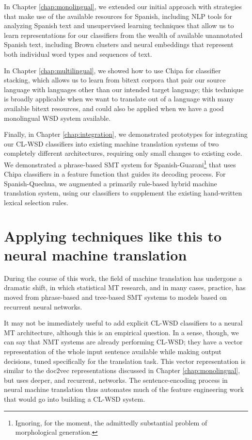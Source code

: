 In Chapter \ref{chap:monolingual}, we extended our initial approach with
strategies that make use of the available resources for Spanish, including NLP
tools for analyzing Spanish text and unsupervised learning techniques that
allow us to learn representations for our classifiers from the wealth of
available unannotated Spanish text, including Brown clusters and neural
embeddings that represent both individual word types and sequences of text.

In Chapter \ref{chap:multilingual}, we showed how to use Chipa for classifier
stacking, which allows us to learn from bitext corpora that pair our source
language with languages other than our intended target language; this technique
is broadly applicable when we want to translate out of a language with many
available bitext resources, and could also be applied when we have a good
monolingual WSD system available.

Finally, in Chapter \ref{chap:integration}, we demonstrated prototypes for
integrating our CL-WSD classifiers into existing machine translation systems of
two completely different architectures, requiring only small changes to
existing code.  We demonstrated a phrase-based SMT system for
Spanish-Guarani\footnote{Ignoring, for the moment, the admittedly substantial
problem of morphological generation.} that uses Chipa classifiers in a feature
function that guides its decoding process. For Spanish-Quechua, we augmented a
primarily rule-based hybrid machine translation system, using our classifiers
to supplement the existing hand-written lexical selection rules.

\section{Applying techniques like this to neural machine translation}
During the course of this work, the field of machine translation has undergone
a dramatic shift, in which statistical MT research, and in many cases,
practice\cite{gnmt}, has moved from phrase-based and tree-based SMT systems to
models based on recurrent neural networks.

It may not be immediately useful to add explicit CL-WSD classifiers to a neural
MT architecture, although this is an empirical question. In a sense, though, we
can say that NMT systems are already performing CL-WSD; they have a vector
representation of the whole input sentence available while making output
decisions, tuned specifically for the translation task. This vector
representation is similar to the doc2vec representations discussed in Chapter
\ref{chap:monolingual}, but uses deeper, and recurrent, networks. The
sentence-encoding process in neural machine translation thus automates much of
the feature engineering work that would go into building a CL-WSD system.

